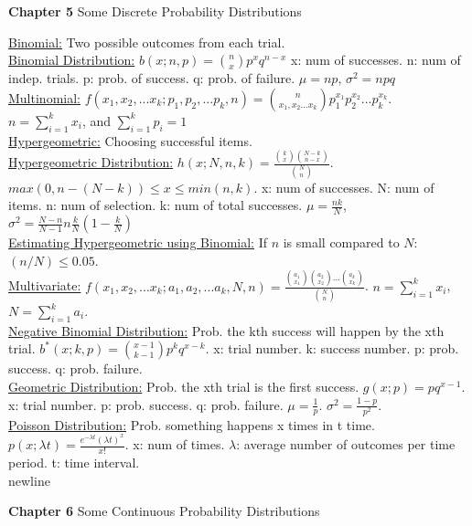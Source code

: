 \documentclass[9pt]{article}
\begin{document}
    \noindent\textbf{Chapter 5} Some Discrete Probability Distributions
    \begin{multicols}{2}
        \noindent\uline{Binomial:} Two possible outcomes from each trial.\\
        \uline{Binomial Distribution:} $b(x;n,p)=\binom{n}{x}p^xq^{n-x}$ 
        x: num of successes. n: num of indep. trials. p: prob. of success.
        q: prob. of failure. $\mu=np$, $\sigma^2=npq$\\
        \uline{Multinomial:} $f(x_1,x_2,...x_k;p_1,p_2,...p_k,n)=\binom{n}{x_1,x_2...x_k}
        p_1^{x_1}p_2^{x_2}...p_k^{x_k}$. $n=\sum_{i=1}^{k}x_i$, and $\sum_{i=1}^{k}p_i=1$\\
        \uline{Hypergeometric:} Choosing successful items.\\
        \uline{Hypergeometric Distribution:} $h(x;N,n,k)=\frac{\binom{k}{x}\binom{N-k}{n-x}}
        {\binom{N}{n}}$. $max(0,n-(N-k))\leq x \leq min(n,k)$. x: num of successes. 
        N: num of items. n: num of selection. k: num of total successes. $\mu=\frac{nk}{N}$,
        $\sigma^2=\frac{N-n}{N-1}n\frac{k}{N}(1-\frac{k}{N})$\\
        \uline{Estimating Hypergeometric using Binomial:} If $n$ is small compared to $N$:
        $(n/N)\leq 0.05$.\\
        \uline{Multivariate:} $f(x_1,x_2,...x_k;a_1,a_2,...a_k,N,n)=\frac{\binom{a_1}{x_1}\binom{a_2}{x_2}
        ...\binom{a_k}{x_k}}{\binom{N}{n}}$. $n=\sum_{i=1}^{k}x_i$, $N=\sum_{i=1}^{k}a_i$.\\
        \uline{Negative Binomial Distribution:} Prob. the kth success will happen by the xth trial.
        $b^*(x;k,p)=\binom{x-1}{k-1}p^kq^{x-k}$. x: trial number. k: success number. p: prob. success.
        q: prob. failure.\\
        \uline{Geometric Distribution:} Prob. the xth trial is the first success. $g(x;p)=pq^{x-1}$.
        x: trial number. p: prob. success. q: prob. failure. $\mu=\frac{1}{p}$. $\sigma^2=\frac{1-p}{p^2}$.\\
        \uline{Poisson Distribution:} Prob. something happens x times in t time. $p(x;\lambda t)=\frac{e^{-\lambda t}(\lambda t)^x}{x!}$.
        x: num of times. $\lambda$: average number of outcomes per time period. t: time interval.\\
        newline
    \end{multicols}
    \noindent\textbf{Chapter 6} Some Continuous Probability Distributions
\end{document}
